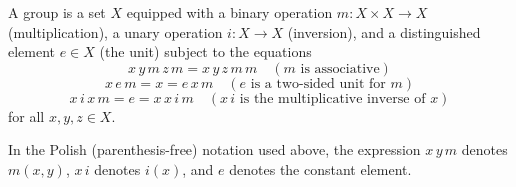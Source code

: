A group is a set $X$ equipped with a binary operation $m: X \times X \longrightarrow X$ (multiplication), a unary operation $i: X \longrightarrow X$ (inversion), and a distinguished element $e \in X$ (the unit) subject to the equations
$$
x\,y\,m\,z\,m = x\,y\,z\,m\,m \quad (\text{$m$ is associative})
$$
$$
x\,e\,m = x = e\,x\,m \quad (\text{$e$ is a two-sided unit for $m$})
$$
$$
x\,i\,x\,m = e = x\,x\,i\,m \quad (\text{$x\,i$ is the multiplicative inverse of $x$})
$$
for all $x, y, z \in X$.

In the Polish (parenthesis-free) notation used above, the expression $x\,y\,m$ denotes $m(x, y)$, $x\,i$ denotes $i(x)$, and $e$ denotes the constant element.
